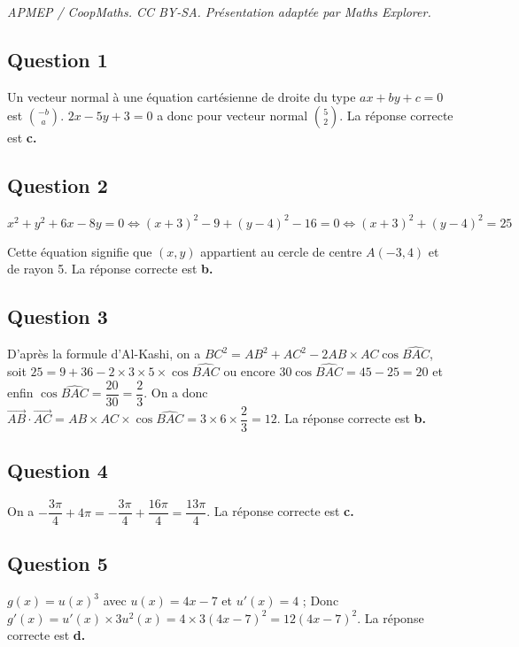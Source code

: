 \documentclass[10pt]{article}
\begin{document}
\noindent\textit{APMEP / CoopMaths. CC BY-SA. Présentation adaptée par Maths Explorer.}\par\medskip
\subsection*{Question 1}
	
	Un vecteur normal à une équation cartésienne de droite du type $ax+by+c=0$ est $\displaystyle\binom{-b}{a}$.
	$2x - 5y + 3 = 0$ a donc pour vecteur normal $\displaystyle\binom{5}{2}$.
	La réponse correcte est \textbf{c.}
	
	\subsection*{Question 2}
	
	\[
	x^2 + y^2 + 6x - 8y = 0 \iff (x + 3)^2 - 9 + (y - 4)^2 - 16 = 0 \iff (x + 3)^2 + (y - 4)^2 = 25
	\]
	
	\noindent Cette équation signifie que $(x, y)$ appartient au cercle de centre $A(-3, 4)$ et de rayon 5. La réponse correcte est \textbf{b.}
	
	\subsection*{Question 3}
	
	D'après la formule d'Al-Kashi, on a $BC^2 = AB^2 + AC^2 - 2AB \times AC \cos \widehat{BAC}$,
	soit $25 = 9 + 36 - 2 \times 3 \times 5 \times \cos \widehat{BAC}$
	ou encore $30 \cos \widehat{BAC} = 45 - 25 = 20$
	et enfin $\cos \widehat{BAC} = \dfrac{20}{30} = \dfrac{2}{3}$.
	On a donc $\overrightarrow{AB} \cdot \overrightarrow{AC} = AB \times AC \times \cos \widehat{BAC} = 3 \times 6 \times \dfrac{2}{3} = 12$. La réponse correcte est \textbf{b.}
	
	\subsection*{Question 4}
	
	On a $-\dfrac{3\pi}{4} + 4\pi = -\dfrac{3\pi}{4} + \dfrac{16\pi}{4} = \dfrac{13\pi}{4}$. La réponse correcte est \textbf{c.}
	
	\subsection*{Question 5}
	
	$g(x)=u(x)^3$ avec $u(x) = 4x - 7$ et $u'(x) = 4$ ;
	Donc $g'(x) = u'(x) \times 3u^2(x) = 4 \times 3(4x - 7)^2 = 12(4x - 7)^2$. La réponse correcte est \textbf{d.}
\end{document}
